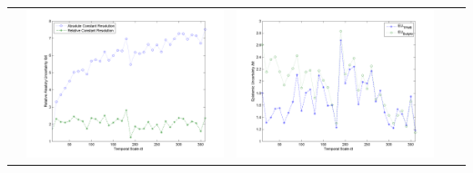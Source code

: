 \documentclass[11pt]{article}
\begin{document}
\begin{table}[H]
{\begin{tabular}{c  c   c   c  c }
&\begin{minipage}{.4\textwidth}\includegraphics[width=\linewidth]{resultgraph/02329000AU.png}\end{minipage}
&\begin{minipage}{.4\textwidth}\includegraphics[width=\linewidth]{resultgraph/02329000EU.png}\end{minipage}
\\

\end{tabular}}
\end{table}
\end{document}
